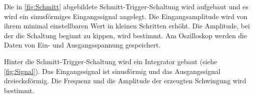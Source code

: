 Die in \autoref{fig:Schmitt} abgebildete Schmitt-Trigger-Schaltung wird aufgebaut und es wird ein sinusförmiges Eingangssignal angelegt. Die Eingangsamplitude wird von ihrem minimal einstellbaren Wert in kleinen Schritten erhöht.
Die Amplitude, bei der die Schaltung beginnt zu kippen, wird bestimmt.
Am Oszilloskop werden die Daten von Ein- und Ausgangsspannung gespeichert.



Hinter die Schmitt-Trigger-Schaltung wird ein Integrator gebaut (siehe \autoref{fig:Signal}). Das Eingangssignal ist sinusförmig und das Ausgangssignal dreiecksförmig. Die Frequenz und die Amplitude der erzeugten Schwingung wird bestimmt. 






